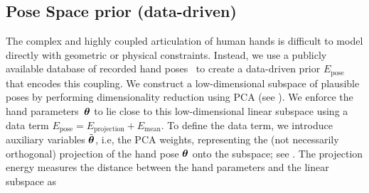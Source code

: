 

\subsection*{Pose Space prior (data-driven)}


The complex and highly coupled articulation of human hands is difficult to model directly with geometric or physical constraints. Instead, we use a publicly available database of recorded hand poses~\cite{schroder2014real} to create a data-driven prior $E_{\text{pose}}$ that encodes this coupling.
We construct a low-dimensional subspace of plausible poses by performing dimensionality reduction using PCA (see ). 
% 
%
We enforce the hand parameters~$\boldsymbol{\theta}$ to lie close to this low-dimensional linear subspace using a 
 data term
$E_{\text{pose}} = E_{\text{projection}} + E_{\text{mean}}$.
%
To define the data term, we introduce auxiliary variables $\tilde{\boldsymbol{\theta}}$, i.e, the PCA weights, representing the (not necessarily orthogonal) projection of the hand pose $\boldsymbol{\theta}$ onto the subspace; see .
The projection energy  measures the distance between the hand parameters and the linear subspace as

